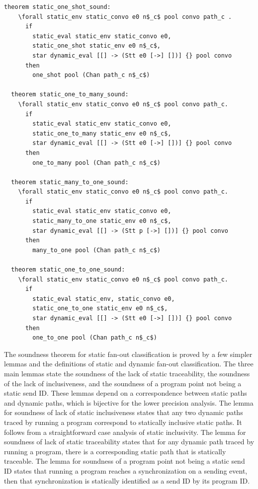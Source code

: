 \documentclass{article}
\begin{document}
\begin{lstlisting}[language=logic, mathescape]
  theorem static_one_shot_sound: 
    \forall static_env static_convo e0 n$_c$ pool convo path_c .
      if
        static_eval static_env static_convo e0, 
        static_one_shot static_env e0 n$_c$, 
        star dynamic_eval [[] -> (Stt e0 [->] [])] {} pool convo
      then
        one_shot pool (Chan path_c n$_c$)

  theorem static_one_to_many_sound:
    \forall static_env static_convo e0 n$_c$ pool convo path_c. 
      if 
        static_eval static_env static_convo e0, 
        static_one_to_many static_env e0 n$_c$, 
        star dynamic_eval [[] -> (Stt e0 [->] [])] {} pool convo
      then
        one_to_many pool (Chan path_c n$_c$)

  theorem static_many_to_one_sound:
    \forall static_env static_convo e0 n$_c$ pool convo path_c. 
      if
        static_eval static_env static_convo e0, 
        static_many_to_one static_env e0 n$_c$, 
        star dynamic_eval [[] -> (Stt p [->] [])] {} pool convo
      then
        many_to_one pool (Chan path_c n$_c$)

  theorem static_one_to_one_sound:
    \forall static_env static_convo e0 n$_c$ pool convo path_c. 
      if
        static_eval static_env, static_convo e0, 
        static_one_to_one static_env e0 n$_c$,
        star dynamic_eval [[] -> (Stt e0 [->] [])] {} pool convo
      then
        one_to_one pool (Chan path_c n$_c$)
\end{lstlisting}

The soundness theorem for static fan-out classification is proved
by a few simpler lemmas and the
definitions of static and dynamic fan-out classification.  The three main lemmas state the
soundness of the lack of static traceability, the soundness of the lack of inclusiveness, and
the soundness of a program point not being a static send ID. These lemmas depend on a
correspondence between static paths and dynamic paths, which is bijective for the lower
precision analysis. The lemma for soundness of lack of static inclusiveness states that any two
dynamic paths traced by running a program correspond to statically inclusive static paths. It
follows from a straightforward case analysis of static inclusivity. The lemma for soundness of
lack of static traceability states that for any dynamic path traced by running a program, there
is a corresponding static path that is statically traceable. The lemma for soundness of a
program point not being a static send ID states that running a program reaches a
synchronization on a sending event, then that synchronization is statically identified as a
send ID by its program ID.
\end{document}
